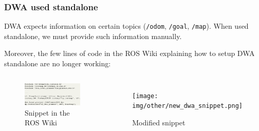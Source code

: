 \documentclass{beamer}
\begin{document}

\begin{frame}
\frametitle{DWA used standalone}

DWA expects information on certain topics (\texttt{/odom}, \texttt{/goal},
\texttt{/map}).
When used standalone, we must provide such information manually.

\vspace{2em}

Moreover, the few lines of code in the ROS Wiki explaining how to setup DWA
standalone are no longer working:

\begin{columns}


\vspace{-1.5em}

\begin{figure}[H]
    \centering
    \includegraphics[scale=0.22]{img/other/old_dwa_snippet.png}
    \caption{Snippet in the ROS Wiki}
\end{figure}


\begin{figure}[H]
    \centering
    \texttt{[image: img/other/new\_dwa\_snippet.png]}
    \caption{Modified snippet}
\end{figure}

\end{columns}

\end{frame}

\end{document}
